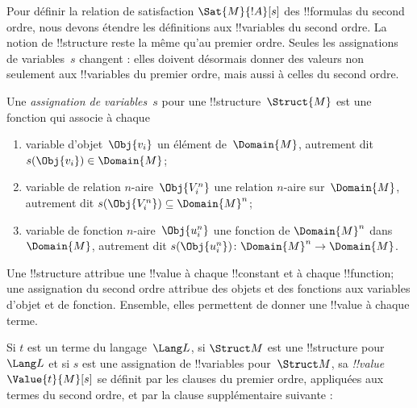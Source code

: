 \documentclass[../../../include/open-logic-section]{subfiles}
\begin{document}


\begin{explain}
Pour définir la relation de satisfaction
$\Sat{M}{!A}[s]$ des !!{formula}s du second ordre,
nous devons étendre les définitions aux
!!{variable}s du second ordre. La notion de
!!{structure} reste la même qu'au premier ordre.
Seules les assignations de variables~$s$ changent :
elles doivent désormais donner des valeurs non
seulement aux !!{variable}s du premier ordre,
mais aussi à celles du second ordre.
\end{explain}

\begin{defn}
Une \emph{assignation de variables}~$s$ pour une
!!{structure}~$\Struct{M}$ est une fonction qui
associe à chaque
\begin{enumerate}
\item variable d'objet~$\Obj{v_i}$ un élément
  de~$\Domain{M}$, autrement dit
  $s(\Obj{v_i})\in\Domain{M}$;
\item variable de relation $n$-aire~$\Obj{V_i^n}$
  une relation $n$-aire sur~$\Domain{M}$,
  autrement dit
  $s(\Obj{V_i^n})\subseteq\Domain{M}^n$;
\item variable de fonction $n$-aire~$\Obj{u_i^n}$
  une fonction de $\Domain{M}^n$ dans~$\Domain{M}$,
  autrement dit
  $s(\Obj{u_i^n})\colon\Domain{M}^n\to\Domain{M}$.
\end{enumerate}
\end{defn}

\begin{explain}
Une !!{structure} attribue une !!{value} à chaque
!!{constant} et à chaque !!{function};
une assignation du second ordre attribue des
objets et des fonctions aux variables d'objet et
de fonction. Ensemble, elles permettent de donner
une !!{value} à chaque terme.
\end{explain}

\begin{defn}
Si $t$ est un terme du langage~$\Lang L$,
si $\Struct M$ est une !!{structure} pour~$\Lang L$
et si $s$ est une assignation de !!{variable}s
pour~$\Struct M$, sa \emph{!!{value}}
$\Value{t}{M}[s]$ se définit par les clauses du premier ordre, appliquées aux termes du second ordre,
et par la clause supplémentaire suivante :
\begin{quote}
\end{quote}
\end{defn}
\end{document}
